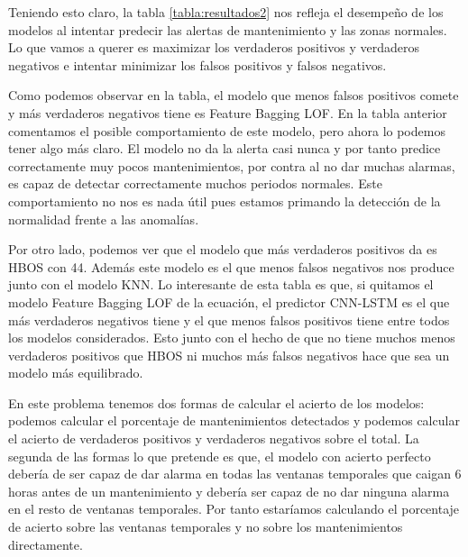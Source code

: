 Teniendo esto claro, la tabla \ref{tabla:resultados2} nos refleja el desempeño de los modelos al intentar predecir las alertas de mantenimiento y las zonas normales. Lo que vamos a querer es maximizar los verdaderos positivos y verdaderos negativos e intentar minimizar los falsos positivos y falsos negativos.

Como podemos observar en la tabla, el modelo que menos falsos positivos comete y más verdaderos negativos tiene es Feature Bagging LOF. En la tabla anterior comentamos el posible comportamiento de este modelo, pero ahora lo podemos tener algo más claro. El modelo no da la alerta casi nunca y por tanto predice correctamente muy pocos mantenimientos, por contra al no dar muchas alarmas, es capaz de detectar correctamente muchos periodos normales. Este comportamiento no nos es nada útil pues estamos primando la detección de la normalidad frente a las anomalías.

Por otro lado, podemos ver que el modelo que más verdaderos positivos da es HBOS con 44. Además este modelo es el que menos falsos negativos nos produce junto con el modelo KNN. Lo interesante de esta tabla es que, si quitamos el modelo Feature Bagging LOF de la ecuación, el predictor CNN-LSTM es el que más verdaderos negativos tiene y el que menos falsos positivos tiene entre todos los modelos considerados. Esto junto con el hecho de que no tiene muchos menos verdaderos positivos que HBOS ni muchos más falsos negativos hace que sea un modelo más equilibrado.

En este problema tenemos dos formas de calcular el acierto de los modelos: podemos calcular el porcentaje de mantenimientos detectados y podemos calcular el acierto de verdaderos positivos y verdaderos negativos sobre el total. La segunda de las formas lo que pretende es que, el modelo con acierto perfecto debería de ser capaz de dar alarma en todas las ventanas temporales que caigan 6 horas antes de un mantenimiento y debería ser capaz de no dar ninguna alarma en el resto de ventanas temporales. Por tanto estaríamos calculando el porcentaje de acierto sobre las ventanas temporales y no sobre los mantenimientos directamente.

